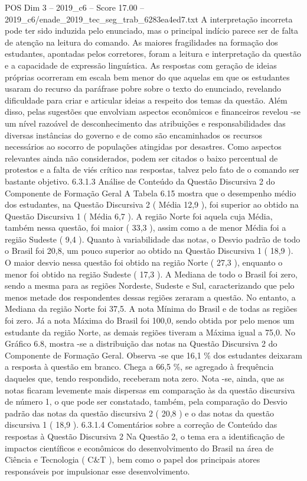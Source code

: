 \begin{textsample}{POS Dim 3 – 2019\_c6 – Score 17.00 – 2019\_c6/enade\_2019\_tec\_seg\_trab\_6283ea4ed7.txt}
A interpretação incorreta pode ter sido induzida pelo enunciado, mas o principal indício parece ser de falta de atenção na leitura do comando.
As maiores fragilidades na formação dos estudantes, apontadas pelos corretores, foram a leitura e interpretação da questão e a capacidade de expressão linguística.
As respostas com geração de ideias próprias ocorreram em escala bem menor do que aquelas em que os estudantes usaram do recurso da paráfrase pobre sobre o texto do enunciado, revelando dificuldade para criar e articular ideias a respeito dos temas da questão.
Além disso, pelas sugestões que envolviam aspectos econômicos e financeiros revelou -se um nível razoável de desconhecimento das atribuições e responsabilidades das diversas instâncias do governo e de como são encaminhados os recursos necessários ao socorro de populações atingidas por desastres.
Como aspectos relevantes ainda não considerados, podem ser citados o baixo percentual de protestos e a falta de viés crítico nas respostas, talvez pelo fato de o comando ser bastante objetivo. 6.3.1.3 Análise de Conteúdo da Questão Discursiva 2 do Componente de Formação Geral A Tabela 6.15 mostra que o desempenho médio dos estudantes, na Questão Discursiva 2 ( Média 12,9 ), foi superior ao obtido na Questão Discursiva 1 ( Média 6,7 ).
A região Norte foi aquela cuja Média, também nessa questão, foi maior ( 33,3 ), assim como a de menor Média foi a região Sudeste ( 9,4 ).
Quanto à variabilidade das notas, o Desvio padrão de todo o Brasil foi 20,8, um pouco superior ao obtido na Questão Discursiva 1 ( 18,9 ).
O maior desvio nessa questão foi obtido na região Norte ( 27,3 ), enquanto o menor foi obtido na região Sudeste ( 17,3 ).
A Mediana de todo o Brasil foi zero, sendo a mesma para as regiões Nordeste, Sudeste e Sul, caracterizando que pelo menos metade dos respondentes dessas regiões zeraram a questão.
No entanto, a Mediana da região Norte foi 37,5.
A nota Mínima do Brasil e de todas as regiões foi zero.
Já a nota Máxima do Brasil foi 100,0, sendo obtida por pelo menos um estudante da região Norte, as demais regiões tiveram a Máxima igual a 75,0.
No Gráfico 6.8, mostra -se a distribuição das notas na Questão Discursiva 2 do Componente de Formação Geral.
Observa -se que 16,1 \% dos estudantes deixaram a resposta à questão em branco.
Chega a 66,5 \%, se agregado à frequência daqueles que, tendo respondido, receberam nota zero.
Nota -se, ainda, que as notas ficaram levemente mais dispersas em comparação às da questão discursiva de número 1, o que pode ser constatado, também, pela comparação do Desvio padrão das notas da questão discursiva 2 ( 20,8 ) e o das notas da questão discursiva 1 ( 18,9 ). 6.3.1.4 Comentários sobre a correção de Conteúdo das respostas à Questão Discursiva 2 Na Questão 2, o tema era a identificação de impactos científicos e econômicos do desenvolvimento do Brasil na área de Ciência e Tecnologia ( C\&T ), bem como o papel dos principais atores responsáveis por impulsionar esse desenvolvimento.

\end{textsample}
